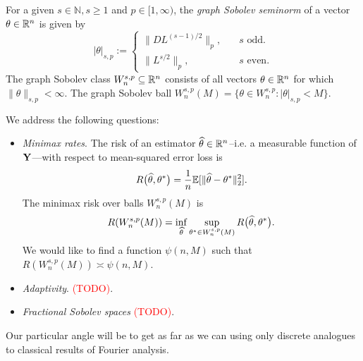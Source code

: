 \documentclass{article}
\begin{document}
	\begin{definition}
		For a given $s \in \mathbb{N}, s \geq 1$ and $p \in [1,\infty)$, the \emph{graph Sobolev seminorm} of a vector $\theta \in \mathbb{R}^n$ is given by
		\begin{equation}
		|\theta|_{s,p} := 
		\begin{cases}
		\|DL^{(s - 1)/2}\|_p, & \quad\textrm{$s$ odd.}\\
		\|L^{s/2}\|_p, & \quad\textrm{$s$ even.}
		\end{cases}
		\end{equation}
		The graph Sobolev class $W_n^{s,p} \subseteq \mathbb{R}^n$ consists of all vectors $\theta \in \mathbb{R}^n$ for which $\|\theta\|_{s,p} < \infty$. The graph Sobolev ball $W_{n}^{s,p}(M) = \{\theta \in W_n^{s,p}: |\theta|_{s,p} < M\}$.
	\end{definition} 
	We address the following questions:
	\begin{itemize}
		\item \emph{Minimax rates}. The risk of an estimator $\widehat{\theta} \in \mathbb{R}^n$--i.e. a measurable function of ${\bf Y}$---with respect to mean-squared error loss is
		\begin{equation}
		\label{eqn:risk}
		R\bigl(\widehat{\theta},\theta^{\ast}\bigr) = \frac{1}{n}\mathbb{E}[\|\widehat{\theta} - \theta^{\ast}\|_2^2]. 
		\end{equation}
		The minimax risk over balls $W_{n}^{s,p}(M)$ is
		\begin{equation}
		R(W_{n}^{s,p}(M)) = \inf_{\widehat{\theta}} \sup_{\theta^{\ast} \in W_n^{s,p}(M)} 	R\bigl(\widehat{\theta},\theta^{\ast}\bigr).
		\end{equation}
		We would like to find a function $\psi(n,M)$ such that $R(W_{n}^{s,p}(M)) \asymp \psi(n,M)$.
		\item \emph{Adaptivity}. \textcolor{red}{(TODO)}.
		\item \emph{Fractional Sobolev spaces} \textcolor{red}{(TODO)}.
	\end{itemize}
	Our particular angle will be to get as far as we can using only discrete analogues to classical results of Fourier analysis.
	
\end{document}
